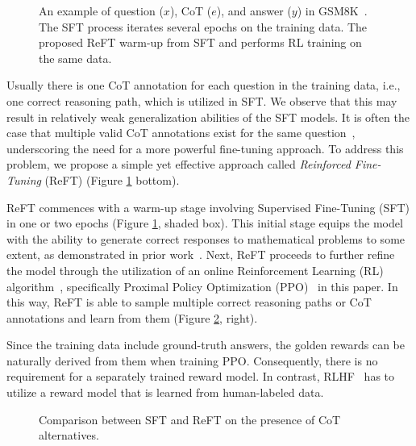 \begin{figure}
    \centering
    \vspace*{-5mm}
    \caption{An example of question ($x$), CoT ($e$), and answer ($y$) in GSM8K~\cite{cobbe2021training}. 
    The SFT process iterates several epochs on the training data.
    The proposed ReFT warm-up from SFT and performs RL training on the same data.
    }
    \label{fig:sft_vs_rft}
\end{figure}

Usually there is one CoT annotation for each question in the training data, i.e., one correct reasoning path, which is utilized in SFT. We observe that this may result in relatively weak generalization abilities of the SFT models. It is often the case that multiple valid CoT annotations exist for the same question~\cite{cobbe2021training,zhang2023interpretable}, underscoring the need for a more powerful fine-tuning approach. To address this problem, we propose a simple yet effective approach called \textit{Reinforced Fine-Tuning} (ReFT) (Figure \ref{fig:sft_vs_rft} bottom).

ReFT commences with a warm-up stage involving Supervised Fine-Tuning (SFT) in one or two epochs (Figure \ref{fig:sft_vs_rft}, shaded box). This initial stage equips the model with the ability to generate correct responses to mathematical problems to some extent, as demonstrated in prior work~\cite{cobbe2021training}. 
Next, ReFT proceeds to further refine the model through the utilization of an online Reinforcement Learning (RL) algorithm~\cite{sutton2018reinforcement}, specifically Proximal Policy Optimization (PPO)~\cite{schulman2017proximal} in this paper. 
In this way,
ReFT is able to sample multiple correct reasoning paths or CoT annotations and learn from them (Figure \ref{fig:sft_vs_ref_path}, right). 

Since the training data include ground-truth answers, the golden rewards can be naturally derived from them when training PPO.
Consequently, there is no requirement for a separately trained reward model.
In contrast, RLHF~\cite{ouyang2022training} has to utilize a reward model that is learned from human-labeled data.

\begin{figure}
    \centering
    \vspace*{-5mm}
    \caption{Comparison between SFT and ReFT on the presence of CoT alternatives.}
    \label{fig:sft_vs_ref_path}
\end{figure}

